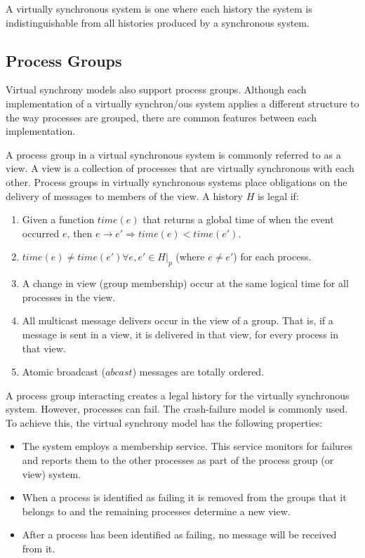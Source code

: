 A virtually synchronous system is one where each history the system is
indistinguishable from all histories produced by a synchronous system.

\subsection{Process Groups}

Virtual synchrony models also support process groups. Although each
implementation of a virtually synchron/ous system applies a different structure
to the way processes are grouped, there are common features between each
implementation.

A process group in a virtual synchronous system is commonly referred to as a
view. A view is a collection of processes that are virtually synchronous
with each other. Process groups in virtually synchronous systems place 
obligations on the delivery of messages to members of the view. A history
$H$ is legal if:

\begin{enumerate}
    \item Given a function $time(e)$ that returns a global time of when the event occurred $e$, then $e \rightarrow e' \Rightarrow time(e) < time(e').$
    \item $time(e) \neq time(e') \forall e, e' \in H|_{p}$ (where $e \neq e'$) for each process.
    \item A change in view (group membership) occur at the same logical time for all processes in the view.
    \item All multicast message delivers occur in the view of a group. That is, if a message is sent in a view, it is delivered in that view, for every process in that view.
    \item Atomic broadcast ($abcast$) messages are totally ordered.
\end{enumerate}

A process group interacting creates a legal history for the virtually
synchronous system. However, processes can fail. The crash-failure model is
commonly used. To achieve this, the virtual synchrony model has the following
properties:

\begin{itemize}
    \item The system employs a membership service. This service monitors for failures and reports them to the other processes as part of the process group (or view) system.
    \item When a process is identified as failing it is removed from the groups that it belongs to and the remaining processes determine a new view.
    \item After a process has been identified as failing, no message will be received from it.
\end{itemize}

